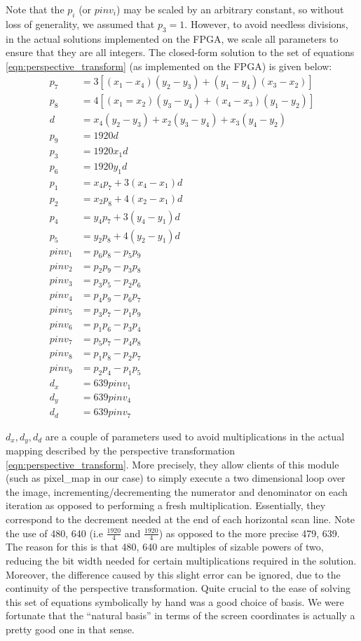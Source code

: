 \documentclass{article}
\begin{document}
Note that the $p_i$ (or $pinv_i$) may be scaled by an arbitrary constant, so without loss of generality, we assumed that $p_3 = 1$.
However, to avoid needless divisions, in the actual solutions implemented on the FPGA,
we scale all parameters to ensure that they are all integers.
The closed-form solution to the set of equations  \eqref{eqn:perspective_transform} (as implemented on the FPGA) is given below:
\begin{align}
    p_7 &= 3[(x_1 - x_4)(y_2 - y_3) + (y_1 - y_4)(x_3 - x_2)] \\
    p_8 &= 4[(x_1 = x_2)(y_3 - y_4) + (x_4 - x_3)(y_1 - y_2)] \\
    d &= x_4(y_2 - y_3) + x_2(y_3 - y_4) + x_3(y_4 - y_2) \\
    p_9 &= 1920 d \\
    p_3 &= 1920 x_1 d \\
    p_6 &= 1920 y_1 d \\
    p_1 &= x_4 p_7 + 3(x_4 - x_1)d \\
    p_2 &= x_2 p_8 + 4(x_2 - x_1)d \\
    p_4 &= y_4 p_7 + 3(y_4 - y_1)d \\
    p_5 &= y_2 p_8 + 4(y_2 - y_1)d \\
    pinv_1 &= p_6 p_8 - p_5 p_9 \\
    pinv_2 &= p_2 p_9 - p_3 p_8 \\
    pinv_3 &= p_3 p_5 - p_2 p_6 \\
    pinv_4 &= p_4 p_9 - p_6 p_7 \\
    pinv_5 &= p_3 p_7 - p_1 p_9 \\
    pinv_6 &= p_1 p_6 - p_3 p_4 \\
    pinv_7 &= p_5 p_7 - p_4 p_8 \\
    pinv_8 &= p_1 p_8 - p_2 p_7 \\
    pinv_9 &= p_2 p_4 - p_1 p_5 \\
    d_x &= 639 pinv_1 \\
    d_y &= 639 pinv_4 \\
    d_d &= 639 pinv_7
\end{align}

$d_x, d_y, d_d$ are a couple of parameters used to avoid multiplications in the actual mapping described by the perspective transformation
\eqref{eqn:perspective_transform}.
More precisely, they allow clients of this module (such as pixel\_map in our case) to simply execute a two dimensional loop over the image,
incrementing/decrementing the numerator and denominator on each iteration as opposed to performing a fresh multiplication.
Essentially, they correspond to the decrement needed at the end of each horizontal scan line.
Note the use of 480, 640 (i.e $\frac{1920}{4}$ and $\frac{1920}{4}$) as opposed to the more precise 479, 639.
The reason for this is that 480, 640 are multiples of sizable powers of two, reducing the bit width needed for certain multiplications required in the solution.
Moreover, the difference caused by this slight error can be ignored, due to the continuity of the perspective transformation.
Quite crucial to the ease of solving this set of equations symbolically by hand was a good choice of basis.
We were fortunate that the ``natural basis'' in terms of the screen coordinates is actually a pretty good one in that sense.
\end{document}
